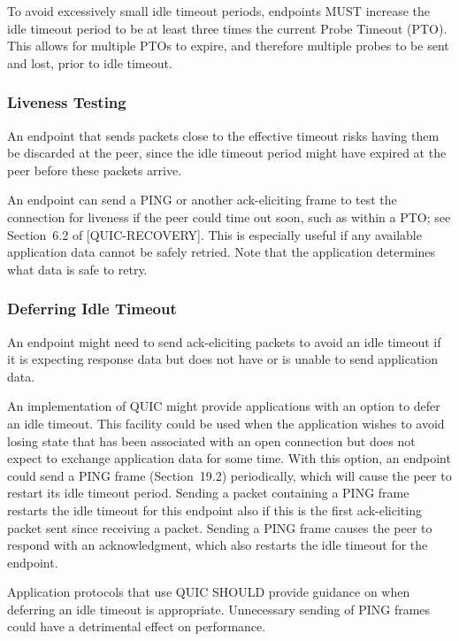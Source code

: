 \documentclass{article}
\begin{document}
To avoid excessively small idle timeout periods, endpoints MUST increase the idle timeout period to be at least three times the current Probe Timeout (PTO).  This allows for multiple PTOs to expire, and therefore multiple probes to be sent and lost, prior to idle timeout.

\subsubsection{Liveness Testing}

An endpoint that sends packets close to the effective timeout risks having them be discarded at the peer, since the idle timeout period might have expired at the peer before these packets arrive.

An endpoint can send a PING or another ack-eliciting frame to test the connection for liveness if the peer could time out soon, such as within a PTO; see Section~6.2 of [QUIC-RECOVERY].  This is especially useful if any available application data cannot be safely retried. Note that the application determines what data is safe to retry.

\subsubsection{Deferring Idle Timeout}

An endpoint might need to send ack-eliciting packets to avoid an idle timeout if it is expecting response data but does not have or is unable to send application data.

An implementation of QUIC might provide applications with an option to defer an idle timeout.  This facility could be used when the application wishes to avoid losing state that has been associated with an open connection but does not expect to exchange application data for some time.  With this option, an endpoint could send a PING frame (Section~19.2) periodically, which will cause the peer to restart its idle timeout period.  Sending a packet containing a PING frame restarts the idle timeout for this endpoint also if this is the first ack-eliciting packet sent since receiving a packet.  Sending a PING frame causes the peer to respond with an acknowledgment, which also restarts the idle timeout for the endpoint.

Application protocols that use QUIC SHOULD provide guidance on when deferring an idle timeout is appropriate.  Unnecessary sending of PING frames could have a detrimental effect on performance.
\end{document}
